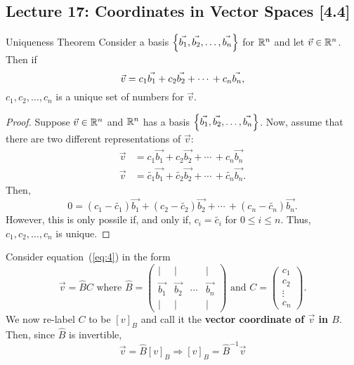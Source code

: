 \subsection{Lecture 17: Coordinates in Vector Spaces [4.4]}
\begin{thm}{Uniqueness Theorem}{}
    Consider a basis $\left\{\vec{b_1}, \vec{b_2}, \ldots, \vec{b_n} \right\}$ for $\mathbb R^{n}$ and let $\vec{v} \in \mathbb R^{n}$. Then if 
    \begin{equation}{\label{eq:4}}
        \vec{v} = c_1\vec{b_1} + c_2\vec{b_2} + \cdots\, + c_n\vec{b_n},
    \end{equation}
    $c_1, c_2, \ldots, c_n$ is a unique set of numbers for $\vec{v}$.
    \begin{proof}
        Suppose $\vec{v} \in \mathbb R^{n}$ and $\mathbb R^{n}$ has a basis $\left\{\vec{b_1}, \vec{b_2}, \ldots, \vec{b_n} \right\}$. Now, assume that there are two different representations of $\vec{v}$: 
        \begin{align*}
            \vec{v} &= c_1\vec{b_1} + c_2\vec{b_2} + \cdots\, + c_n\vec{b_n} \\
            \vec{v} &= \tilde{c_1}\vec{b_1} + \tilde{c_2}\vec{b_2} + \cdots\, + \tilde{c_n}\vec{b_n}.
        \end{align*}
        Then, 
        \[
            0 = \left(c_1 - \tilde{c_1}\right)\vec{b_1} + \left(c_2 - \tilde{c_2}\right)\vec{b_2} + \cdots\, + \left(c_n - \tilde{c_n}\right)\vec{b_n}.
        \]
        However, this is only possile if, and only if, $c_i = \tilde{c_i}$ for $0 \leq i \leq n$. Thus, $c_1, c_2, \ldots, c_n$ is unique.
    \end{proof} 
\end{thm}

Consider equation~(\ref{eq:4}) in the form 
\[
    \vec{v} = \hat{B}C \text{ where } \hat{B} = \begin{pmatrix}
        | & | & & | \\
        \vec{b_1} & \vec{b_2} & \cdots & \vec{b_n} \\
        | & | & & |
    \end{pmatrix}
    \text{ and }
    C = \begin{pmatrix}
        c_1 \\ c_2 \\ \vdots \\ c_n
    \end{pmatrix}.
\]
We now re-label $C$ to be $[v]_{B}$ and call it the \textbf{vector coordinate of $\vec{v}$ in $B$}. Then, since $\hat{B}$ is invertible, 
\[
    \vec{v} = \hat{B}\left[v\right]_{B} \Rightarrow [v]_{B} = \hat{B}^{-1}\vec{v}
\]

